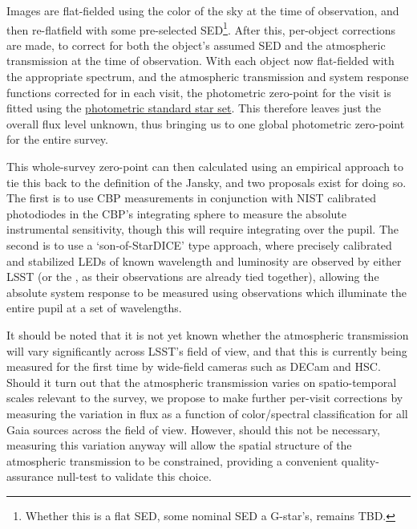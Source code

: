 Images are flat-fielded using the color of the sky at the time of observation, and then re-flatfield with some pre-selected SED\footnote{ Whether this is a flat SED, some nominal SED \eg a G-star's, remains TBD.}. After this, per-object corrections are made, to correct for both the object's assumed SED and the atmospheric transmission at the time of observation. 
With each object now flat-fielded with the appropriate spectrum, and the atmospheric transmission and system response functions corrected for in each visit, the photometric zero-point for the visit is fitted using the \hyperref[sec:CPP:output:spectrophotometricStandards]{photometric standard star set}. This therefore leaves just the overall flux level unknown, thus bringing us to one global photometric zero-point for the entire survey.


This whole-survey zero-point can then calculated using an empirical approach to tie this back to the definition of the Jansky, and two proposals exist for doing so. The first is to use CBP measurements in conjunction with NIST calibrated photodiodes in the CBP's integrating sphere to measure the absolute instrumental sensitivity, though this will require integrating over the pupil. The second is to use a `son-of-StarDICE' type approach, where precisely calibrated and stabilized LEDs of known wavelength and luminosity are observed by either LSST (or the \auxtelescope, as their observations are already tied together), allowing the absolute system response to be measured using observations which illuminate the entire pupil at a set of wavelengths.
















It should be noted that it is not yet known whether the atmospheric transmission will vary significantly across LSST's field of view, and that this is currently being measured for the first time by wide-field cameras such as DECam and HSC. Should it turn out that the atmospheric transmission varies on spatio-temporal scales relevant to the survey, we propose to make further per-visit corrections by measuring the variation in flux as a function of color/spectral classification for all Gaia sources across the field of view. However, should this not be necessary, measuring this variation anyway will allow the spatial structure of the atmospheric transmission to be constrained, providing a convenient quality-assurance null-test to validate this choice.





